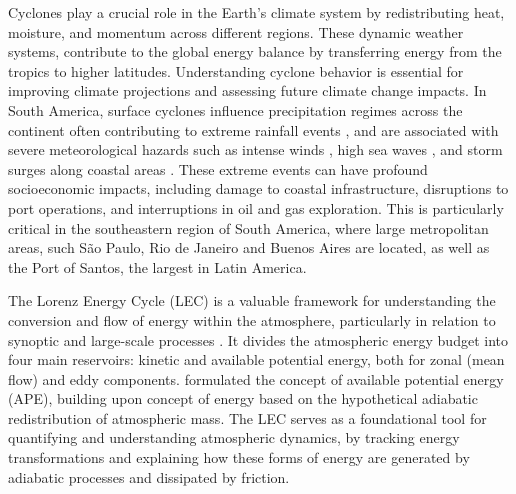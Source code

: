 \documentclass[pdflatex,sn-chicago]{sn-jnl}%
\theoremstyle{plain}
\theoremstyle{definition}
\theoremstyle{remark}
\theoremstyle{definition}
\begin{document}
Cyclones play a crucial role in the Earth's climate system by redistributing heat, moisture, and momentum across different regions. These dynamic weather systems, contribute to the global energy balance by transferring energy from the tropics to higher latitudes. Understanding cyclone behavior is essential for improving climate projections and assessing future climate change impacts. In South America, surface cyclones influence precipitation regimes across the continent \citep{reboita2010precipitation, reboita2018extratropical, de2022hybrid} often contributing to extreme rainfall events \citep[e.g.,][]{de2021ocean,de2024extreme}, and are associated with severe meteorological hazards such as intense winds \citep{cardoso2022synoptic,de2021ocean}, high sea waves \citep{da2025classification,gramcianinov2023impact}, and storm surges along coastal areas \citep{leal2023identification,tecchiomean}. These extreme events can have profound socioeconomic impacts, including damage to coastal infrastructure, disruptions to port operations, and interruptions in oil and gas exploration. This is particularly critical in the southeastern region of South America, where large metropolitan areas, such São Paulo, Rio de Janeiro and Buenos Aires are located, as well as the Port of Santos, the largest in Latin America. 

The Lorenz Energy Cycle (LEC) is a valuable framework for understanding the conversion and flow of energy within the atmosphere, particularly in relation to synoptic and large-scale processes \citep{lorenz1967nature}. It divides the atmospheric energy budget into four main reservoirs: kinetic and available potential energy, both for zonal (mean flow) and eddy components. \citet{lorenz1955available} formulated the concept of available potential energy (APE), building upon \citet{margules1903energie} concept of energy based on the hypothetical adiabatic redistribution of atmospheric mass. The LEC serves as a foundational tool for quantifying and understanding atmospheric dynamics, by tracking energy transformations and explaining how these forms of energy are generated by adiabatic processes and dissipated by friction.
\end{document}
